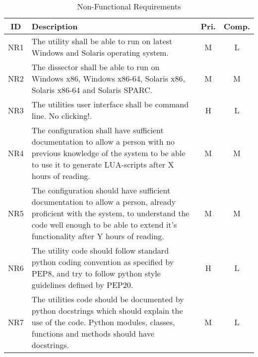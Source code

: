 \begin{table}[ht] \small \center
\caption{Non-Functional Requirements\label{tab:nonfuncreq}}
\begin{tabular}{c | p{9cm} | c  c }
	ID & Description & Pri. & Comp. \\ \hline \hline
	NR1 & The utility shall be able to run on latest Windows and Solaris
		operating system.
		& M & L \\ \hline
	NR2 & The dissector shall be able to run on Windows x86, Windows x86-64,
		Solaris x86, Solaris x86-64 and Solaris SPARC.
		& M & M \\ \hline
	NR3 & The utilities user interface shall be command line. No clicking!.
		& H & L \\ \hline
	NR4 & The configuration shall have sufficient documentation to allow a
		person with no previous knowledge of the system to be able to use it
		to generate LUA-scripts after X hours of reading.
		& M & M \\ \hline
	NR5 & The configuration should have sufficient documentation to allow a
		person, already proficient with the system, to understand the code
		well enough to be able to extend it’s functionality after Y hours of
		reading.
		& M & M \\ \hline
	NR6 & The utility code should follow standard python coding convention as
		specified by PEP8, and try to follow python style guidelines defined
		by PEP20.
		& H & L \\ \hline
	NR7 & The utilities code should be documented by python docstrings which
		should explain the use of the code. Python modules, classes, functions
		and methods should have docstrings.
		& M & L \\
\end{tabular}
\end{table}

